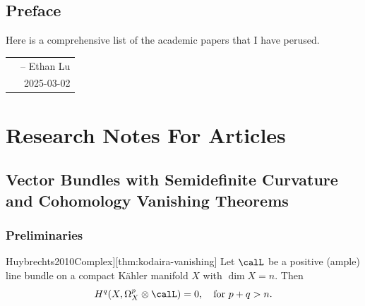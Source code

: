 \documentclass[lang=en,12pt]{beautybook}
\begin{document}
\frontmatter
{}

{%
  \thispagestyle{empty}
  \chapter*{Preface}
  Here is a comprehensive list of the academic papers that I have perused.


  \hfill
  \begin{tabular}{lr}
     & -- Ethan Lu \\
     & 2025-03-02
  \end{tabular}
  \clearpage}

\thispagestyle{empty}
\tableofcontents\let\cleardoublepage\clearpage


\mainmatter
{}

\part{Research Notes For Articles}


\chapter{Vector Bundles with Semidefinite Curvature and Cohomology Vanishing Theorems}

\section{Preliminaries}

\begin{theorem}[][Kodaira vanishing theorem\cite[P196]{Huybrechts2010Complex}][thm:kodaira-vanishing]
  Let $\calL$ be a positive (ample) line bundle on a compact K\"ahler manifold $X$ with $\dim X=n$. Then
  \begin{equation}
    H^q (X,\Omega_X^p \otimes \calL)=0,\quad \text{for  }p+q>n.
  \end{equation}
\end{theorem}
\end{document}
